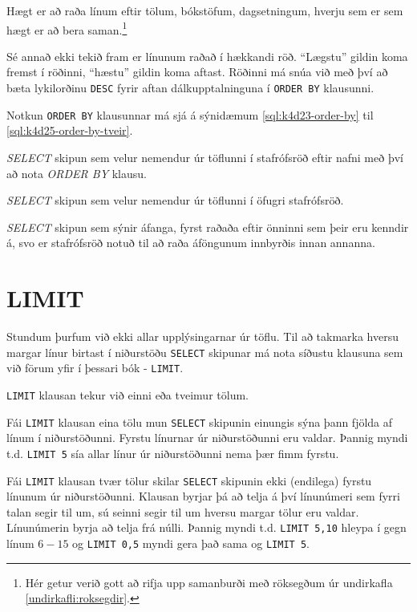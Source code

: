 Hægt er að raða línum eftir tölum, bókstöfum, dagsetningum, hverju sem er sem hægt er að bera saman.\footnote{Hér getur verið gott að rifja upp samanburði með röksegðum úr undirkafla \ref{undirkafli:roksegdir}.}

Sé annað ekki tekið fram er línunum raðað í hækkandi röð. ``Lægstu'' gildin koma fremst í röðinni, ``hæstu'' gildin koma aftast. Röðinni má snúa við með því að bæta lykilorðinu \verb|DESC| fyrir aftan dálkupptalninguna í \verb|ORDER BY| klausunni.

Notkun \verb|ORDER BY| klausunnar má sjá á sýnidæmum \ref{sql:k4d23-order-by} til \ref{sql:k4d25-order-by-tveir}.

\begin{example}
\caption[ORDER BY]{\emph{SELECT} skipun sem velur nemendur úr töflunni í stafrófsröð eftir nafni með því að nota \emph{ORDER BY} klausu.}
\label{sql:k4d23-order-by}
\centering
{}
\end{example}

\begin{example}
\caption[ORDER BY með DESC]{\emph{SELECT} skipun sem velur nemendur úr töflunni í öfugri stafrófsröð.}
\label{sql:k4d24-order-by-desc}
\centering
{}
\end{example}

\begin{example}
\caption[ORDER BY með tveimur dálkum]{\emph{SELECT} skipun sem sýnir áfanga, fyrst raðaða eftir önninni sem þeir eru kenndir á, svo er stafrófsröð notuð til að raða áföngunum innbyrðis innan annanna.}
\label{sql:k4d25-order-by-tveir}
\centering
{}
\end{example}
\section{LIMIT}
Stundum þurfum við ekki allar upplýsingarnar úr töflu. Til að takmarka hversu margar línur birtast í niðurstöðu \verb|SELECT| skipunar má nota síðustu klausuna sem við förum yfir í þessari bók - \verb|LIMIT|.

\verb|LIMIT| klausan tekur við einni eða tveimur tölum. 

Fái \verb|LIMIT| klausan eina tölu mun \verb|SELECT| skipunin einungis sýna þann fjölda af línum í niðurstöðunni. Fyrstu línurnar úr niðurstöðunni eru valdar. Þannig myndi t.d. \verb|LIMIT 5| sía allar línur úr niðurstöðunni nema þær fimm fyrstu.

Fái \verb|LIMIT| klausan tvær tölur skilar \verb|SELECT| skipunin ekki (endilega) fyrstu línunum úr niðurstöðunni. Klausan byrjar þá að telja á því línunúmeri sem fyrri talan segir til um, sú seinni segir til um hversu margar tölur eru valdar. Línunúmerin byrja að telja frá núlli. Þannig myndi t.d. \verb|LIMIT 5,10| hleypa í gegn línum $6-15$ og \verb|LIMIT 0,5| myndi gera það sama og \verb|LIMIT 5|.

